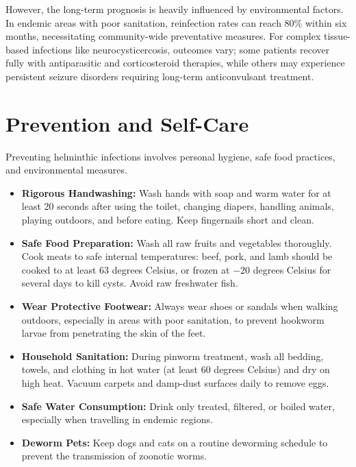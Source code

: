 However, the long-term prognosis is heavily influenced by environmental factors. In endemic areas with poor sanitation, reinfection rates can reach 80\% within six months, necessitating community-wide preventative measures. For complex tissue-based infections like neurocysticercosis, outcomes vary; some patients recover fully with antiparasitic and corticosteroid therapies, while others may experience persistent seizure disorders requiring long-term anticonvulsant treatment.

\section*{Prevention and Self-Care}
Preventing helminthic infections involves personal hygiene, safe food practices, and environmental measures.
\begin{itemize}
    \item \textbf{Rigorous Handwashing:} Wash hands with soap and warm water for at least 20 seconds after using the toilet, changing diapers, handling animals, playing outdoors, and before eating. Keep fingernails short and clean.
    \item \textbf{Safe Food Preparation:} Wash all raw fruits and vegetables thoroughly. Cook meats to safe internal temperatures: beef, pork, and lamb should be cooked to at least 63 degrees Celsius, or frozen at $-20$ degrees Celsius for several days to kill cysts. Avoid raw freshwater fish.
    \item \textbf{Wear Protective Footwear:} Always wear shoes or sandals when walking outdoors, especially in areas with poor sanitation, to prevent hookworm larvae from penetrating the skin of the feet.
    \item \textbf{Household Sanitation:} During pinworm treatment, wash all bedding, towels, and clothing in hot water (at least 60 degrees Celsius) and dry on high heat. Vacuum carpets and damp-dust surfaces daily to remove eggs.
    \item \textbf{Safe Water Consumption:} Drink only treated, filtered, or boiled water, especially when travelling in endemic regions.
    \item \textbf{Deworm Pets:} Keep dogs and cats on a routine deworming schedule to prevent the transmission of zoonotic worms.
\end{itemize}

